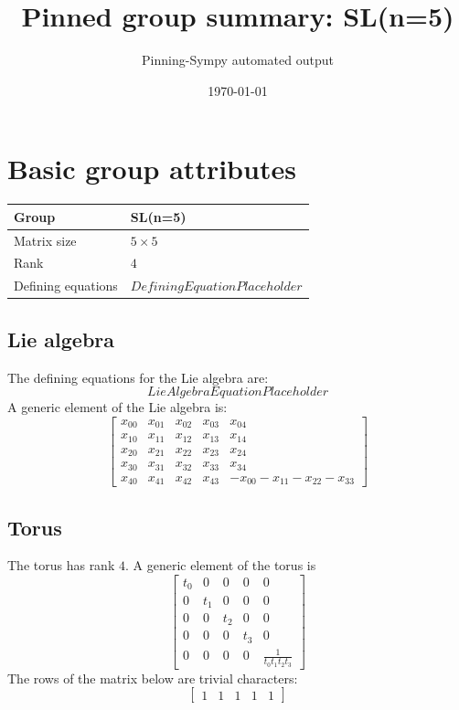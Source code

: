 \documentclass[11pt]{article}
\title{Pinned group summary: SL(n=5)}
\author{Pinning-Sympy automated output}
\date{\today}
\theoremstyle{definition}
\begin{document}
\maketitle
\tableofcontents

\newpage

\section{Basic group attributes}

\begin{tabular}{|l|l|}
	\hline
    Group & SL(n=5) \\
	\hline
    Matrix size & $5 \times 5$ \\
	\hline
    Rank & $4$ \\
	\hline
	Defining equations & $DefiningEquationPlaceholder$ \\
	\hline
\end{tabular}



\subsection{Lie algebra}

The defining equations for the Lie algebra are:
\[
LieAlgebraEquationPlaceholder
\]
A generic element of the Lie algebra is:
\[
\left[\begin{matrix}x_{0 0} & x_{0 1} & x_{0 2} & x_{0 3} & x_{0 4}\\x_{1 0} & x_{1 1} & x_{1 2} & x_{1 3} & x_{1 4}\\x_{2 0} & x_{2 1} & x_{2 2} & x_{2 3} & x_{2 4}\\x_{3 0} & x_{3 1} & x_{3 2} & x_{3 3} & x_{3 4}\\x_{4 0} & x_{4 1} & x_{4 2} & x_{4 3} & - x_{0 0} - x_{1 1} - x_{2 2} - x_{3 3}\end{matrix}\right]
\]

\subsection{Torus}

The torus has rank $4$. A generic element of the torus is
\[
\left[\begin{matrix}t_{0} & 0 & 0 & 0 & 0\\0 & t_{1} & 0 & 0 & 0\\0 & 0 & t_{2} & 0 & 0\\0 & 0 & 0 & t_{3} & 0\\0 & 0 & 0 & 0 & \frac{1}{t_{0} t_{1} t_{2} t_{3}}\end{matrix}\right]
\]
The rows of the matrix below are trivial characters:
\[
\left[\begin{matrix}1 & 1 & 1 & 1 & 1\end{matrix}\right]
\]
\end{document}
